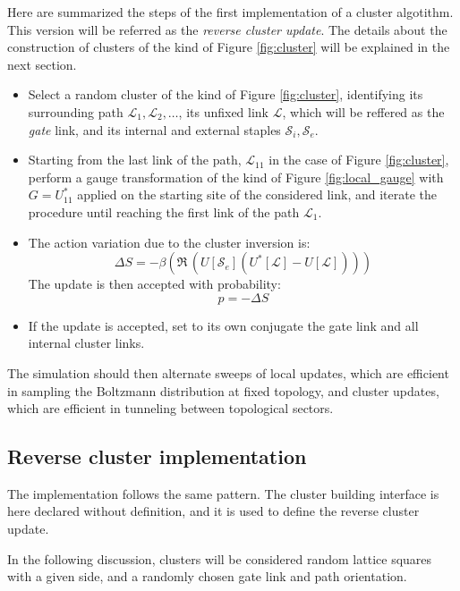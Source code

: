 Here are summarized the steps of the first implementation of a cluster algotithm.
This version will be referred as the \emph{reverse cluster update}.
The details about the construction of clusters of the kind of Figure \ref{fig:cluster}
will be explained in the next section.

\begin{itemize}
    \item
        Select a random cluster of the kind of Figure \ref{fig:cluster},
        identifying its surrounding path $\mathcal L_1, \mathcal L_2, \ldots$,
        its unfixed link $\mathcal L$, which will be reffered as the \emph{gate} link,
        and its internal and external staples $\mathcal S_i, \mathcal S_e$.
    \item 
        Starting from the last link of the path,
        $\mathcal L_{11}$ in the case of Figure \ref{fig:cluster},
        perform a gauge transformation of the kind of Figure \ref{fig:local_gauge}
        with $G=U^*_{11}$ applied on the starting site of the considered link,
        and iterate the procedure until reaching the first link of the path $\mathcal L_1$.
    \item
        The action variation due to the cluster inversion is:
        \[
            \Delta S = -\beta(\Re\,(U[\mathcal S_e](U^*[\mathcal L]-U[\mathcal L])))
        \]
        The update is then accepted with probability:
        \[
            p = -\Delta S
        \]
    \item 
        If the update is accepted,
        set to its own conjugate the gate link and all internal cluster links.
\end{itemize}

The simulation should then alternate sweeps of local updates,
which are efficient in sampling the Boltzmann distribution at fixed topology,
and cluster updates, which are efficient in tunneling between topological sectors.

\subsection{Reverse cluster implementation}
The implementation follows the same pattern.
The cluster building interface is here declared without definition,
and it is used to define the reverse cluster update.

In the following discussion,
clusters will be considered random lattice squares with a given side,
and a randomly chosen gate link and path orientation.

